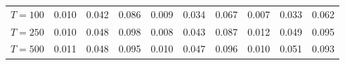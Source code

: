 % 
\begin{tabular}{cccccccccc}
  \hline
  \hline
$T = 100$ & 0.010 & 0.042 & 0.086 & 0.009 & 0.034 & 0.067 & 0.007 & 0.033 & 0.062 \\ 
  $T = 250$ & 0.010 & 0.048 & 0.098 & 0.008 & 0.043 & 0.087 & 0.012 & 0.049 & 0.095 \\ 
  $T = 500$ & 0.011 & 0.048 & 0.095 & 0.010 & 0.047 & 0.096 & 0.010 & 0.051 & 0.093 \\ 
   \hline
\end{tabular}
